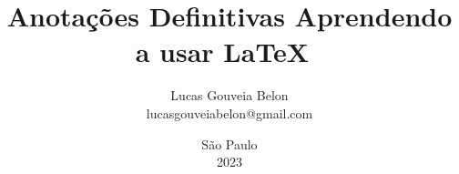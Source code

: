 \title{                                 %
\textbf{Anotações Definitivas}          %
\break                                  %
Aprendendo a usar \LaTeX\               %
\vspace{5cm}                            %
}                                       %
\pagestyle{fancy}                       %
\author{                                %
    Lucas Gouveia Belon \\              %
    lucasgouveiabelon@gmail.com         %
}                                       %
\date{\vspace{2.2cm}São Paulo\\2023}    %
\maketitle                              %
\newpage                                %

